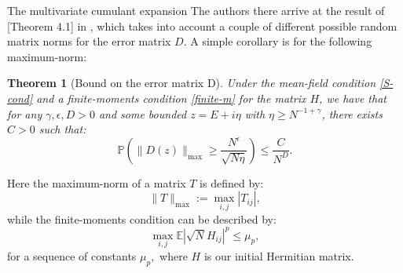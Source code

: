 \documentclass[11pt, a4paper, oneside]{book}
\numberwithin{equation}{chapter}
\newcommand{\E}{\mathbb E}
\newcommand{\beq}{\begin{equation}}
\newcommand{\eeq}{\end{equation}}
\newtheorem{thm}{Theorem}[section]
\begin{document}
\begin{section}{The multivariate cumulant expansion}
The authors there arrive at the result of [Theorem 4.1] in \cite{erdHos2019random}, which takes into account a couple of different possible random matrix norms for the error matrix $D$. A simple corollary is for the following maximum-norm:
%
\begin{thm}[Bound on the error matrix D] \label{error-thm}
    Under the mean-field condition \eqref{S-cond} and a finite-moments condition \eqref{finite-m} for the matrix $H$, we have that for any $\gamma, \epsilon , D > 0 $ and some bounded $z=E+i\eta$ with $\eta \geq N^{-1+\gamma}$, there exists $C>0$ such that:
    \beq
    \mathbb{P} \left ( \| D(z) \|_{\max} \geq \frac{N^\epsilon}{\sqrt{N\eta}} \right ) \leq \frac{C}{N^D} .
    \eeq
\end{thm}
%
Here the maximum-norm of a matrix $T$ is defined by:
\beq \label{max-norm}
\|T\|_{\max} := \max \limits_{i,j} |T_{ij}|,
\eeq
while the finite-moments condition can be described by:
\beq \label{finite-m}
\max \limits_{i,j} \E  |\sqrt{N}H_{ij} |^p  \leq \mu_p,
\eeq
for a sequence of constants $\mu_p,$ where $H$ is our initial Hermitian matrix.
\end{section}
\end{document}
